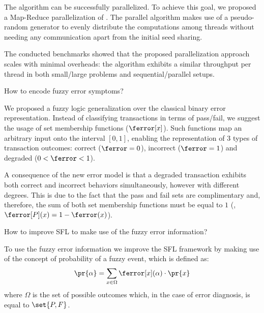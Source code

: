 The \staccato{} algorithm can be successfully parallelized.
%
To achieve this goal, we proposed a Map-Reduce parallelization of
\staccato{}.
%
The parallel algorithm makes use of a pseudo-random generator to
evenly distribute the computations among threads without needing any
communication apart from the initial seed sharing.

The conducted benchmarks showed that the proposed parallelization
approach scales with minimal overheads: the algorithm exhibits a
similar throughput per thread in both small/large problems and
sequential/parallel setups.
%

\begin{description}[leftmargin=!,labelwidth=\widthof{\bfseries \Cref{rq:optimizations} ---}]
\item [\Cref{rq:fuzzy-error-encoding} ---] How to encode fuzzy error
  symptoms?
\end{description}

We proposed a fuzzy logic generalization over the classical binary
error representation.
%
Instead of classifying transactions in terms of pass/fail, we suggest
the usage of set membership functions ($\ferror[x]$).
%
Such functions map an arbitrary input onto the interval $[0,1]$,
enabling the representation of $3$ types of transaction outcomes:
correct ($\ferror = 0$), incorrect ($\ferror = 1$) and degraded ($0 <
\ferror < 1$).

A consequence of the new error model is that a degraded transaction
exhibits both correct and incorrect behaviors simultaneously, however
with different degrees.
%
This is due to the fact that the pass and fail sets are complimentary
and, therefore, the sum of both set membership functions must be equal
to $1$ (\ie, $\ferror[P](x) = 1 - \ferror(x)$).

\begin{description}[leftmargin=!,labelwidth=\widthof{\bfseries \Cref{rq:optimizations} ---}]
\item [\Cref{rq:SFL-fuzzy-error-generalization} ---] How to improve
  \ac{SFL} to make use of the fuzzy error information?
\end{description}

To use the fuzzy error information we improve the \ac{SFL} framework
by making use of the concept of probability of a fuzzy event, which is
defined as:
\begin{equation}
  \pr{\alpha} = \sum_{x\in\Omega}{\ferror[x](\alpha) \cdot \pr{x}}
\end{equation}
\noindent
where $\Omega$ is the set of possible outcomes which, in the case of error
diagnosis, is equal to $\set{P,F}$.

